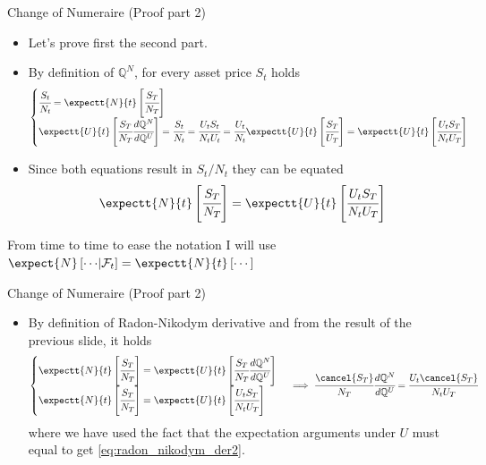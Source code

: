 \documentclass{beamer}
\begin{document}
	\begin{frame}{Change of Numeraire (Proof part 2)}
		\begin{itemize}
			\item Let's prove first the second part.
			\item By definition of $\mathbb{Q}^N$, for every asset price $S_t$ holds
			\begin{equation*}
				\begin{cases}
					\cfrac{S_t}{N_t} = \expectt{N}{t}\left[\cfrac{S_T}{N_T}\right] \\
					\expectt{U}{t}\left[\cfrac{S_T}{N_T}\cfrac{d\mathbb{Q}^N}{d\mathbb{Q}^U}\right] = \cfrac{S_t}{N_t} = \cfrac{U_t S_t}{N_t U_t}
					= \cfrac{U_t}{N_t}\expectt{U}{t}\left[\cfrac{S_T}{U_T}\right] = \expectt{U}{t}\left[\cfrac{U_t S_T}{N_t U_T}\right]
				\end{cases}
			\end{equation*}
			\item Since both equations result in $S_t/N_t$ they can be equated
			\begin{equation*}
				\expectt{N}{t}\left[\cfrac{S_T}{N_T}\right] = \expectt{U}{t}\left[\cfrac{U_t S_T}{N_t U_T}\right]
			\end{equation*}
		\end{itemize}
		\vfill
		\begin{tcolorbox}[colback=gray!5, colframe=maincolor, arc=0mm, boxrule=0.5pt]
		\footnotesize
		From time to time to ease the notation I will use $\expect{N}\left[\cdots \middle| \mathcal{F}_t\right] = \expectt{N}{t}\left[\cdots\right]$
		\end{tcolorbox}
	\end{frame}

	\begin{frame}{Change of Numeraire (Proof part 2)}
		\begin{itemize}
			\item By definition of Radon-Nikodym derivative and from the result of the previous slide, it holds
			\begin{equation*}
				\begin{cases}
					\expectt{N}{t}\left[\cfrac{S_T}{N_T}\right] =\expectt{U}{t}\left[\cfrac{S_T}{N_T} \cfrac{d\mathbb{Q}^N}{d\mathbb{Q}^U}\right] \\
					\expectt{N}{t}\left[\cfrac{S_T}{N_T}\right] =\expectt{U}{t}\left[\cfrac{U_t S_T}{N_t U_T}\right]
				\end{cases}\implies
				\cfrac{\cancel{S_T}}{N_T} \cfrac{d\mathbb{Q}^N}{d\mathbb{Q}^U} = \cfrac{U_t \cancel{S_T}}{N_t U_T}
			\end{equation*}
			where we have used the fact that the expectation arguments under $U$ must equal to get \cref{eq:radon_nikodym_der2}.
		\end{itemize}
		\myendproof
	\end{frame}
\end{document}
